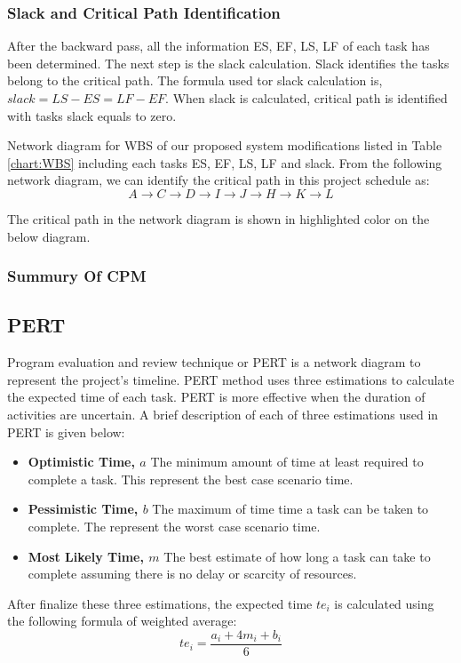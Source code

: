 \begin{spacing}{1}
\subsubsection{Slack and Critical Path Identification}
After the backward pass, all the information ES, EF, LS, LF of each task has been determined. The next step is the slack calculation. Slack identifies the tasks belong to the critical path. The formula used tor slack calculation is,$ slack =  LS - ES = LF - EF $. When slack is calculated, critical path is identified with tasks slack equals to zero. 

Network diagram for WBS of our proposed system modifications listed in Table \ref{chart:WBS} including each tasks ES, EF, LS, LF and slack. From the following network diagram, we can identify the critical path in this project schedule as: \newline
\[ A \to C \to D \to I \to J \to H \to K \to L \]

The critical path in the network diagram is shown in highlighted  color on the below diagram.

\subsubsection{Summury Of CPM}  


\subsection{PERT}
Program evaluation and review technique or PERT is a network diagram to represent the project's timeline. PERT method uses three estimations to calculate the expected time of each task. PERT is more effective when the duration of activities are uncertain. A brief description of each of three estimations used in PERT is given below:
\begin{itemize}
	\item \textbf{Optimistic Time, $a$} The minimum amount of time at least required to complete a task. This represent the best case scenario time.
	\item \textbf{Pessimistic Time, $b$} The maximum of time time a task can be taken to complete. The represent the worst case scenario time.
	\item \textbf{Most Likely Time, $m$} The best estimate of how long a task can take to complete assuming there is no delay or scarcity of resources.
\end{itemize} 

After finalize these three estimations, the expected time $te_{i}$ is calculated using the following formula of weighted average: \newline
\begin{equation}
te_{i} = \frac{a_i + 4m_i + b_i}{6} 
\end{equation}


\end{spacing}
